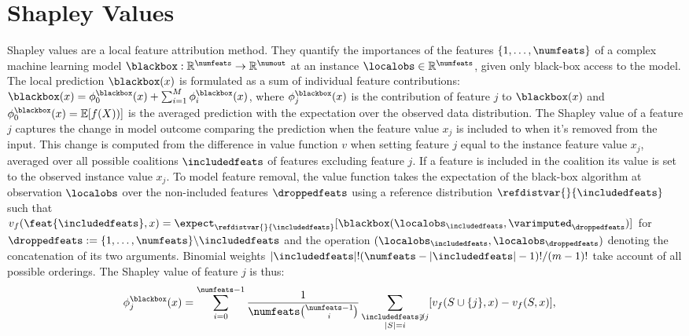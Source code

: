 \documentclass{article}
\theoremstyle{plain}
\theoremstyle{definition}
\theoremstyle{remark}
\theoremstyle{mystyle}
\begin{document}
\section{Shapley Values}
\label{sec:shapley_intro}
Shapley values are a local feature attribution method. They quantify the importances of the features  $\{1,\ldots,\numfeats\}$ of a complex machine learning model $\blackbox:\mathbb{R}^{\numfeats}\rightarrow\mathbb{R}^{\numout}$ at an instance $\localobs\in\mathbb{R}^{\numfeats}$, given only black-box access to the model. The local prediction $\blackbox(x)$ is formulated as a sum of individual feature contributions: $\blackbox(x)=\phi^{\blackbox}_{0}(x)+\sum_{i=1}^{M} \phi^{\blackbox}_{i}(x)$, where $\phi^{\blackbox}_{j}(x)$ is the contribution of feature $j$ to $\blackbox(x)$ and $\phi^{\blackbox}_{0}(x)=\mathbb{E} [f(X))]$ is the averaged prediction with the expectation over the observed data distribution. The Shapley value of a feature $j$ captures the change in model outcome comparing the prediction when the feature value $x_j$ is included to when it's removed from the input. This change is computed from the difference in value function $v$ when setting feature $j$ equal to the instance feature value $x_j$, averaged over all possible coalitions $\includedfeats$ of features excluding feature $j$. If a feature is included in the coalition its value is set to the observed instance value $x_j$. To model feature removal, the value function takes the expectation of the black-box algorithm at observation $\localobs$ over the non-included features $\droppedfeats$ using a reference distribution $\refdistvar{}{\includedfeats}$ such that $v_f(\feat{\includedfeats},x)=\expect_{\refdistvar{}{\includedfeats}}[\blackbox({\localobs_{\includedfeats}, \varimputed_{\droppedfeats}})] \label{eq:expvalue}$ for $\droppedfeats:=\{1,\ldots,\numfeats\} \backslash \includedfeats$ and the operation $({\localobs_{\includedfeats}, \localobs_{\droppedfeats}})$ denoting the concatenation of its two arguments.
Binomial weights ${|\includedfeats|!(\numfeats-|\includedfeats|-1)!}/(m-1)!$ take account of all possible orderings. The Shapley value of feature $j$ is thus:
\begin{align*}
    \phi_j^\blackbox(x) 
    &=   \sum_{i=0}^{\numfeats-1}   \frac{1}{\numfeats\binom{\numfeats-1}{i}} \sum_{\substack{\includedfeats \not\owns j \\|S|=i}} [v_f(S \cup \{j\}, x) - v_f(S, x)],
\end{align*}
\end{document}
